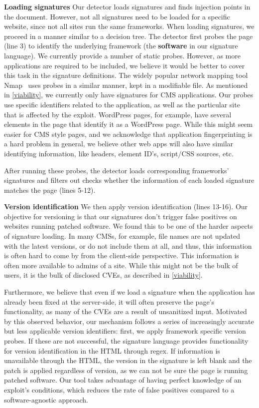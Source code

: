 \textbf{Loading signatures}
Our detector loads signatures and finds injection points in the document. However, not all signatures need to be loaded for a specific website, since not all sites run the same frameworks. When loading signatures, we proceed in a manner similar to a decision tree. The detector first probes the page (line 3) to identify the underlying framework (the \textbf{software} in our signature language). We currently provide a number of static probes. However, as more applications are required to be included, we believe it would be better to cover this task in the signature definitions. The widely popular network mapping tool Nmap~\cite{nMap} uses probes in a similar manner, kept in a modifiable file. As mentioned in \autoref{viability}, we currently only have signatures for CMS applications. Our probes use specific identifiers related to the application, as well as the particular site that is affected by the exploit. WordPress pages, for example, have several elements in the page that identify it as a WordPress page. While this might seem easier for CMS style pages, and we acknowledge that application fingerprinting is a hard problem in general, we believe other web apps will also have similar identifying information, like headers, element ID's, script/CSS sources, etc.

After running these probes, the detector loads corresponding frameworks' signatures and filters out checks whether the information of each loaded signature matches the page (lines 5-12).

\textbf{Version identification}
We then apply version identification (lines 13-16). Our objective for versioning is that our signatures don't trigger false positives on websites running patched software. We found this to be one of the harder aspects of signature loading. In many \acp{CMS}, for example, file names are not updated with the latest versions, or do not include them at all, and thus, this information is often hard to come by from the client-side perspective. This information is often more available to admins of a site. While this might not be the bulk of users, it is the bulk of disclosed CVEs, as described in \autoref{viability}.

Furthermore, we believe that even if we load a signature when the application has already been fixed at the server-side, it will often preserve the page's functionality, as many of the CVEs are a result of unsanitized input. Motivated by this observed behavior, our mechanism follows a series of increasingly accurate but less applicable version identifiers: first, we apply framework specific version probes. If these are not successful, the signature language provides functionality for version identification in the HTML through regex. If information is unavailable through the HTML, the version in the signature is left blank and the patch is applied regardless of version, as we can not be sure the page is running patched software. Our tool takes advantage of having perfect knowledge of an exploit's conditions, which reduces the rate of false positives compared to a software-agnostic approach.

